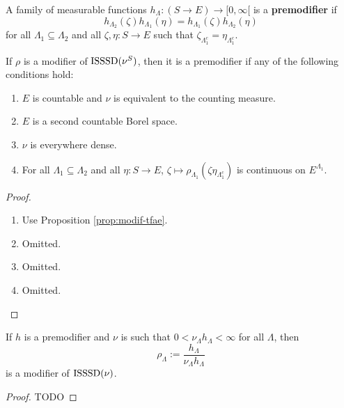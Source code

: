 
\begin{definition}[Premodifier]
    \label{def:premodif}

    A family of measurable functions $h_\Lambda : (S \to E) \to [0, \infty[$ is a {\bf premodifier} if
    $$h_{\Lambda_2}(\zeta)h_{\Lambda_1}(\eta) = h_{\Lambda_1}(\zeta)h_{\Lambda_2}(\eta)$$
    for all $\Lambda_1 \subseteq \Lambda_2$ and all $\zeta, \eta : S \to E$ such that $\zeta_{\Lambda_1^c} = \eta_{\Lambda_1^c}$.
\end{definition}

\begin{lemma}
    \label{lem:modif-premodif}
    If $\rho$ is a modifier of $\operatorname{ISSSD}(\nu^S)$, then it is a premodifier if any of the following conditions hold:
    \begin{enumerate}
        \item $E$ is countable and $\nu$ is equivalent to the counting measure.
        \item $E$ is a second countable Borel space.
        \item $\nu$ is everywhere dense.
        \item For all $\Lambda_1 \subseteq \Lambda_2$ and all $\eta : S \to E$, $\zeta \mapsto \rho_{\Lambda_1}(\zeta \eta_{\Lambda_1^c})$ is continuous on $E^{\Lambda_1}$.
    \end{enumerate}
\end{lemma}
\begin{proof}

    \begin{enumerate}
        \item Use Proposition \ref{prop:modif-tfae}.
        \item Omitted.
        \item Omitted.
        \item Omitted.
    \end{enumerate}
\end{proof}

\begin{lemma}
    \label{lem:premodif-modif}

    If $h$ is a premodifier and $\nu$ is such that $0 < \nu_\Lambda h_\Lambda < \infty$ for all $\Lambda$, then
    $$\rho_\Lambda := \frac{h_\Lambda}{\nu_\Lambda h_\Lambda}$$
    is a modifier of $\operatorname{ISSSD}(\nu)$.
\end{lemma}
\begin{proof}

    TODO
\end{proof}


